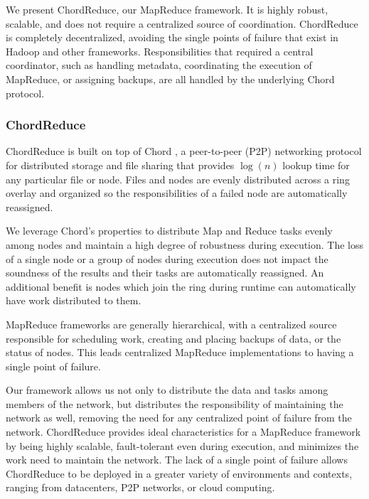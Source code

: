 \documentclass{article}
\begin{document}
We present ChordReduce, our MapReduce framework.  It is highly robust, scalable, and does not require a centralized source of coordination.  ChordReduce is completely decentralized, avoiding the single points of failure that exist in Hadoop and other frameworks. Responsibilities  that required a central coordinator, such as handling metadata, coordinating the execution of MapReduce, or assigning backups,  are all handled by the underlying Chord protocol.

\subsubsection*{ChordReduce}

ChordReduce is built on top of Chord \cite{Chord}, a peer-to-peer (P2P) networking protocol for distributed storage and file sharing that provides $\log(n)$ lookup time for any particular file or node.
Files and nodes are evenly distributed across a ring overlay and organized so the responsibilities of a failed node are automatically reassigned. 

We leverage Chord's properties to distribute Map and Reduce tasks evenly among nodes and maintain a high degree of robustness during execution.  
The loss of a single node or a group of nodes during execution does not impact the soundness of the results and their tasks are automatically reassigned. 
An additional benefit is nodes which join the ring during runtime can automatically have work distributed to them.

MapReduce frameworks are generally hierarchical, with a centralized source responsible for scheduling work, creating and placing backups of data, or the status of nodes.  This leads centralized MapReduce implementations to having a single point of failure.

Our framework allows us not only to distribute the data and tasks among members of the network, but distributes the responsibility of maintaining the network as well, removing the need for any centralized point of failure from the network.
ChordReduce provides ideal characteristics for a MapReduce framework by being highly scalable, fault-tolerant even during execution, and minimizes the work need to maintain the network.  The lack of a single point of failure allows ChordReduce to be deployed in a greater variety of environments and contexts, ranging from datacenters, P2P networks, or cloud computing.
\end{document}
